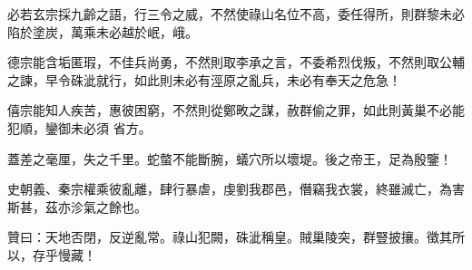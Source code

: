 \begin{pinyinscope}
 必若玄宗採九齡之語，行三令之威，不然使祿山名位不高，委任得所，則群黎未必陷於塗炭，萬乘未必越於岷，峨。



 德宗能含垢匿瑕，不佳兵尚勇，不然則取李承之言，不委希烈伐叛，不然則取公輔之諫，早令硃泚就行，如此則未必有涇原之亂兵，未必有奉天之危急！



 僖宗能知人疾苦，惠彼困窮，不然則從鄭畋之謀，赦群偷之罪，如此則黃巢不必能犯順，鑾御未必須
 省方。



 蓋差之毫厘，失之千里。蛇螫不能斷腕，蟻穴所以壞堤。後之帝王，足為殷鑒！



 史朝義、秦宗權乘彼亂離，肆行暴虐，虔劉我郡邑，僭竊我衣裳，終雖滅亡，為害斯甚，茲亦沴氣之餘也。



 贊曰：天地否閉，反逆亂常。祿山犯闕，硃泚稱皇。賊巢陵突，群豎披攘。徵其所以，存乎慢藏！



\end{pinyinscope}